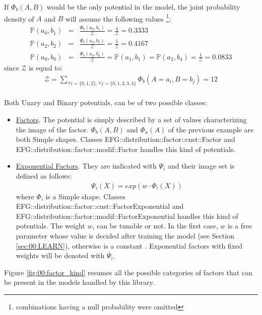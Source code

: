 If $\Phi _b(A,B)$ would be the only potential in the model, the joint probability density of $A$ and $B$ will assume the following values \footnote{combinations having a null probability were omitted}:
\begin{eqnarray}
\mathbb{P}(a_0 , b_1) &=& \frac{ \Phi_b(a_0 , b_1) }{\mathcal{Z}} = \frac{ 4 }{\mathcal{Z}} = 0.3333 \label{eq:00:ex_prob_cmpt_1} \\
\mathbb{P}(a_2 , b_2) &=& \frac{ \Phi_b(a_2 , b_2) }{\mathcal{Z}} = \frac{ 5 }{\mathcal{Z}} = 0.4167 \label{eq:00:ex_prob_cmpt_2} \\
\mathbb{P}(a_0 , b_0) &=& \frac{ \Phi_b(a_0 , b_0) }{\mathcal{Z}} = \mathbb{P}(a_1 , b_1)=\mathbb{P}(a_2 , b_4)= \frac{ 1 }{\mathcal{Z}} = 0.0833 \label{eq:00:ex_prob_cmpt_3}
\end{eqnarray}
since $\mathcal{Z}$ is equal to:
\begin{eqnarray}
\mathcal{Z} = \sum _{ \forall i=\lbrace 0,1,2 \rbrace , \forall j= \lbrace 0,1,2,3,4 \rbrace } \Phi _b(A = a_i,B = b_j) = 12
\end{eqnarray}
\\
Both Unary and Binary potentials, can be of two possible classes:
\begin{itemize}
\item \underline{Factors}. The potential is simply described by a set of values characterizing the image of the factor. $\Phi _b(A,B)$ and $\Phi _u(A)$ of the previous example are both Simple shapes. Classes EFG::distribution::factor::cnst::Factor and EFG::distribution::factor::modif::Factor handles this kind of potentials.
\item \underline{Exponential Factors}. They are indicated with $\Psi_i$ and their image set is defined as follows:
\begin{eqnarray}
\Psi _i(X) = exp(w \cdot \Phi_i(X) ) 
\label{eq:00:exp_w}
\end{eqnarray}
where $\Phi_i$ is a Simple shape. Classes EFG::distribution::factor::cnst::FactorExponential and EFG::distribution::factor::modif::FactorExponential handles this kind of potentials.
The weight $w$, can be tunable or not. In the first case, $w$ is a free parameter whose value is decided after training the model (see Section \ref{sec:00:LEARN}), otherwise is a constant . Exponential factors with fixed weights will be denoted with $\overline{\Psi}_i$. 
\end{itemize}

Figure \ref{fig:00:factor_kind} resumes all the possible categories of factors that can be present in the models handled by this library.

